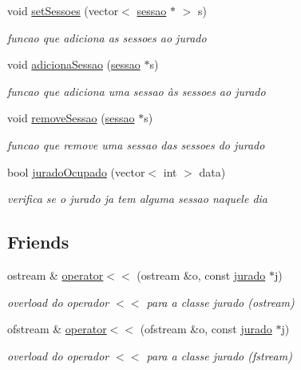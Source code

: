 \begin{DoxyCompactItemize}
void \hyperlink{classjurado_af6a351dce6c2e9dac755254bc4137b58}{set\+Sessoes} (vector$<$ \hyperlink{classsessao}{sessao} $\ast$ $>$ s)
\begin{DoxyCompactList}\small\item\em funcao que adiciona as sessoes ao jurado \end{DoxyCompactList}\item 
void \hyperlink{classjurado_a3c18c6b03f81ac8927571f9008307ab7}{adiciona\+Sessao} (\hyperlink{classsessao}{sessao} $\ast$s)
\begin{DoxyCompactList}\small\item\em funcao que adiciona uma sessao às sessoes ao jurado \end{DoxyCompactList}\item 
void \hyperlink{classjurado_adb3bd37bd370642bcdc4c8cb404ff9de}{remove\+Sessao} (\hyperlink{classsessao}{sessao} $\ast$s)
\begin{DoxyCompactList}\small\item\em funcao que remove uma sessao das sessoes do jurado \end{DoxyCompactList}\item 
bool \hyperlink{classjurado_a2cd7669a1f16ebe8cb1ac997dd82f8cc}{jurado\+Ocupado} (vector$<$ int $>$ data)
\begin{DoxyCompactList}\small\item\em verifica se o jurado ja tem alguma sessao naquele dia \end{DoxyCompactList}\end{DoxyCompactItemize}
\subsection*{Friends}
\begin{DoxyCompactItemize}
\item 
ostream \& \hyperlink{classjurado_afbbe037345e49122dbab2fd21278225d}{operator$<$$<$} (ostream \&o, const \hyperlink{classjurado}{jurado} $\ast$j)
\begin{DoxyCompactList}\small\item\em overload do operador $<$$<$ para a classe jurado (ostream) \end{DoxyCompactList}\item 
ofstream \& \hyperlink{classjurado_a9778784aa84765cf798f6cfc59656ce2}{operator$<$$<$} (ofstream \&o, const \hyperlink{classjurado}{jurado} $\ast$j)
\begin{DoxyCompactList}\small\item\em overload do operador $<$$<$ para a classe jurado (fstream) \end{DoxyCompactList}\end{DoxyCompactItemize}


